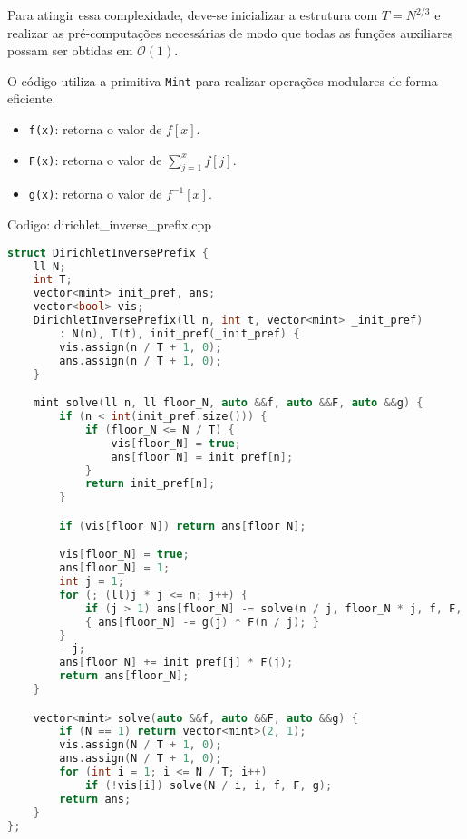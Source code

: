 \documentclass[10pt, a4paper, oneside]{book}
\begin{document}
Para atingir essa complexidade, deve-se inicializar a estrutura com $T = N^{2/3}$ e realizar as pré-computações necessárias de modo que todas as funções auxiliares possam ser obtidas em $\mathcal{O}(1)$.



O código utiliza a primitiva \texttt{Mint} para realizar operações modulares de forma eficiente.



\textbf{} 


\begin{itemize}
\item \texttt{f(x)}: retorna o valor de $f[x]$.
\item \texttt{F(x)}: retorna o valor de $\sum_{j=1}^{x} f[j]$.
\item \texttt{g(x)}: retorna o valor de $f^{-1}[x]$.
\end{itemize}

\hfill

Codigo: dirichlet\_inverse\_prefix.cpp

\begin{lstlisting}[language=C++]
struct DirichletInversePrefix {
    ll N;
    int T;
    vector<mint> init_pref, ans;
    vector<bool> vis;
    DirichletInversePrefix(ll n, int t, vector<mint> _init_pref)
        : N(n), T(t), init_pref(_init_pref) {
        vis.assign(n / T + 1, 0);
        ans.assign(n / T + 1, 0);
    }

    mint solve(ll n, ll floor_N, auto &&f, auto &&F, auto &&g) {
        if (n < int(init_pref.size())) {
            if (floor_N <= N / T) {
                vis[floor_N] = true;
                ans[floor_N] = init_pref[n];
            }
            return init_pref[n];
        }

        if (vis[floor_N]) return ans[floor_N];

        vis[floor_N] = true;
        ans[floor_N] = 1;
        int j = 1;
        for (; (ll)j * j <= n; j++) {
            if (j > 1) ans[floor_N] -= solve(n / j, floor_N * j, f, F, g) * f(j);
            { ans[floor_N] -= g(j) * F(n / j); }
        }
        --j;
        ans[floor_N] += init_pref[j] * F(j);
        return ans[floor_N];
    }

    vector<mint> solve(auto &&f, auto &&F, auto &&g) {
        if (N == 1) return vector<mint>(2, 1);
        vis.assign(N / T + 1, 0);
        ans.assign(N / T + 1, 0);
        for (int i = 1; i <= N / T; i++)
            if (!vis[i]) solve(N / i, i, f, F, g);
        return ans;
    }
};
\end{lstlisting}
\hfill
\end{document}

